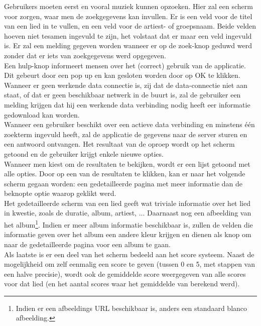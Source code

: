 \documentclass[11pt,a4paper]{article}
\begin{document}
Gebruikers moeten eerst en vooral muziek kunnen opzoeken. Hier zal een scherm voor zorgen, waar men de zoekgegevens kan invullen. Er is een veld voor de titel van een lied in te vullen, en een veld voor de artiest- of groepsnaam. Beide velden hoeven niet tesamen ingevuld te zijn, het volstaat dat er maar een veld ingevuld is. Er zal een melding gegeven worden wanneer er op de zoek-knop geduwd werd zonder dat er iets van zoekgegevens werd opgegeven.
\\ 

Een hulp-knop informeert mensen over het (correct) gebruik van de applicatie. Dit gebeurt door een pop up en kan gesloten worden door op OK te klikken. 
\\ 
 
Wanneer er geen werkende data connectie is, zij dat de data-connectie niet aan staat, of dat er geen beschikbaar netwerk in de buurt is, zal de gebruiker een melding krijgen dat hij een werkende data verbinding nodig heeft eer informatie gedownload kan worden. 
\\ 
	
Wanneer een gebruiker beschikt over een actieve data verbinding en minstens één zoekterm ingevuld heeft, zal de applicatie de gegevens naar de server sturen en een antwoord ontvangen. Het resultaat van de oproep wordt op het scherm getoond en de gebruiker krijgt enkele nieuwe opties.
\\


	
Wanneer men kiest om de resultaten te bekijken, wordt er een lijst getoond met alle opties. Door op een van de resultaten te klikken, kan er naar het volgende scherm gegaan worden: een gedetailleerde pagina met meer informatie  dan de beknopte optie waarop geklikt werd. 
\\ 
	
Het gedetailleerde scherm van een lied geeft wat triviale informatie over het lied in kwestie, zoals de duratie, album, artiest, ... Daarnaast nog een afbeelding van het album\footnote{Indien er een afbeeldings URL beschikbaar is, anders een standaard blanco afbeelding.}. Indien er meer album informatie beschikbaar is, zullen de velden die informatie geven over het album een andere kleur krijgen en dienen als knop om naar de gedetailleerde pagina voor een album te gaan. 
\\ 	
Als laatste is er een deel van het scherm bedeeld aan het score systeem. Naast de mogelijkheid om zelf eenmalig een score te geven (tussen 0 en 5, met stappen van een halve precisie), wordt ook de gemiddelde score weergegeven van alle scores voor dat lied (en het aantal scores waar het gemiddelde van berekend werd). 
\\ 
	
\end{document}
